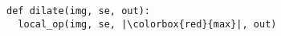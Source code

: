 \documentclass[varwidth=4cm, border={0.1cm 0.1cm 0.1cm 0.1cm}]{standalone}
\begin{document}
\begin{verbatim}
def dilate(img, se, out):
  local_op(img, se, |\colorbox{red}{max}|, out)
\end{verbatim}
\end{document}
